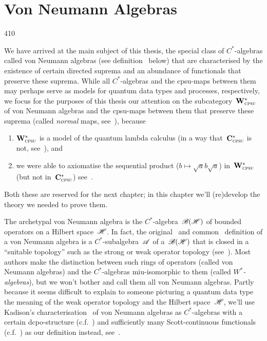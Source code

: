 \chapter{Von Neumann Algebras}
\begin{parsec}{410}%
\begin{point}{10}%
We have arrived at the main subject of this thesis,
the special class of $C^*$-algebras
called von Neumann algebras (see definition~ below)
that are characterised by the existence
of certain directed suprema 
and an abundance  of functionals that preserve
these suprema.
While all $C^*$-algebras
and the cpsu-maps
between them
may perhaps serve as models for
quantum data types and processes, respectively,
we focus
for the purposes of this thesis
 our attention on
the subcategory~$\mathbf{W}^*_{\text{\textsc{cpsu}}}$ of von Neumann algebras
and the cpsu-maps between them that preserve these suprema
(called \emph{normal} maps, see~),
because 
\begin{enumerate}
\item
$\mathbf{W}^*_{\text{\textsc{cpsu}}}$
is a model of the quantum lambda calculus
(in a way that~$\mathbf{C}^*_{\text{\textsc{cpsu}}}$ is not,
see~), and
\item
we were able to axiomatise
the sequential product ($b\mapsto \sqrt{a}b\sqrt{a}$)
in~$\mathbf{W}^*_{\text{\textsc{cpsu}}}$ 
(but not in~$\mathbf{C}^*_{\text{\textsc{cpsu}}}$)
see~.
\end{enumerate}
Both these are reserved for the next chapter;
in this chapter we'll (re)develop the theory
we needed to prove them.

The archetypal von Neumann algebra
is the $C^*$-algebra~$\mathscr{B}(\mathscr{H})$
of bounded operators on a Hilbert space~$\mathscr{H}$.
In fact,
the
original~\cite{vn1930,mvn1936}
and common~\cite{kr,conway2000} 
definition of a von Neumann algebra
is a $C^*$-subalgebra~$\mathscr{A}$
of a~$\mathscr{B}(\mathscr{H})$
that is closed in a ``suitable topology''
such as the strong or weak operator topology
(see~).
Most authors make the distinction
between such rings of operators
(called von Neumann algebras)
and the $C^*$-algebras
miu-isomorphic to them
(called \emph{$W^*$-algebras}),
but we won't bother and call them all von Neumann algebras.
Partly because it seems difficult
to explain 
to someone
picturing a quantum data type
the meaning of the weak operator topology
and the Hilbert space~$\mathscr{H}$,
we'll use Kadison's characterisation~\cite{kadison1956}
of von Neumann algebras
as $C^*$-algebras
with a certain dcpo-structure (c.f.~)
and sufficiently many Scott-continuous functionals (c.f.~)
as our definition instead, see~.


\end{point}
\end{parsec}
